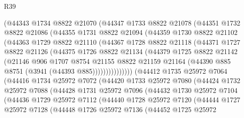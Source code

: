 \begin{lexlean}{R39}
\begin{coremodule}
          (@44343
            @1734
            @8822
            @21070
            (@44347
              @1733
              @8822
              @21078
              (@44351
                @1732
                @8822
                @21086
                (@44355
                  @1731
                  @8822
                  @21094
                  (@44359
                    @1730
                    @8822
                    @21102
                    (@44363
                      @1729
                      @8822
                      @21110
                      (@44367
                        @1728
                        @8822
                        @21118
                        (@44371
                          @1727
                          @8822
                          @21126
                          (@44375
                            @1726
                            @8822
                            @21134
                            (@44379
                              @1725
                              @8822
                              @21142
                              (@21146
                                @906
                                @1707
                                @8754
                                @21155
                                @8822
                                @21159
                                @21164
                                (@44390 @885 @8751 (@3941 (@44393 @885)))))))))))))))
        (@44412
          @1735
          @25972
          @7064
          (@44416
            @1734
            @25972
            @7072
            (@44420
              @1733
              @25972
              @7080
              (@44424
                @1732
                @25972
                @7088
                (@44428
                  @1731
                  @25972
                  @7096
                  (@44432
                    @1730
                    @25972
                    @7104
                    (@44436
                      @1729
                      @25972
                      @7112
                      (@44440
                        @1728
                        @25972
                        @7120
                        (@44444
                          @1727
                          @25972
                          @7128
                          (@44448
                            @1726
                            @25972
                            @7136
                            (@44452
                              @1725
                              @25972

\end{coremodule}
\end{lexlean}
